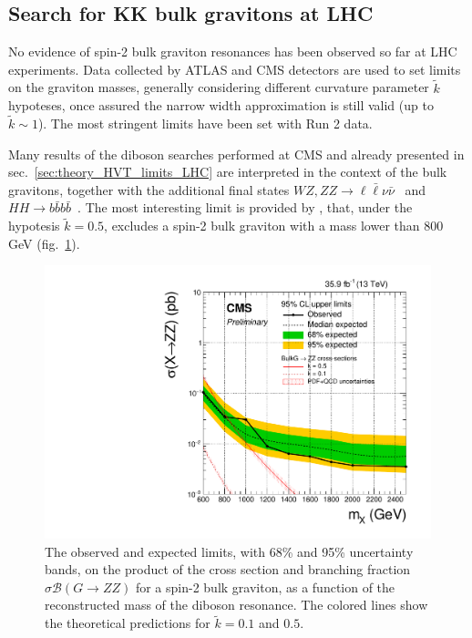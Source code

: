 \newpage
\subsection{Search for KK bulk gravitons at LHC}
\label{sec:theory_KK_limits_LHC}
No evidence of spin-2 bulk graviton resonances has been observed so far at LHC experiments. Data collected by ATLAS and CMS detectors are used to set limits on the graviton masses, generally considering different curvature parameter $\tilde{k}$ hypoteses, once assured the narrow width approximation is still valid (up to $\tilde{k} \sim 1$). The most stringent limits have been set with Run 2 data.

\vspace*{1\baselineskip}

Many results of the diboson searches performed at CMS and already presented in sec.~\ref{sec:theory_HVT_limits_LHC} are interpreted in the context of the bulk gravitons, together with the additional final states $WZ, ZZ \rightarrow \ell \bar{\ell} \nu \bar{\nu}$~\cite{CMS-PAS-B2G-16-023} and $HH \rightarrow b\bar{b} b \bar{b}$~\cite{CMS-PAS-B2G-16-026}. The most interesting limit is provided by \cite{CMS-PAS-B2G-16-023}, that, under the hypotesis $\tilde{k} = 0.5$, excludes a spin-2 bulk graviton with a mass lower than 800 GeV (fig.~\ref{fig:theory_B2G-16-023}).

\begin{figure}[!htb]
  \centering
    \includegraphics[width=.495\textwidth]{figures/B2G-16-023/Figure_005.pdf}
  \caption{The observed and expected limits, with 68\% and 95\% uncertainty bands, on the product of the cross section and branching fraction $\sigma \mathcal{B} (G \rightarrow ZZ)$ for a spin-2 bulk graviton, as a function of the reconstructed mass of the diboson resonance. The colored lines show the theoretical predictions for $\tilde{k}=0.1$ and $0.5$.}
  \label{fig:theory_B2G-16-023}
\end{figure}

\vspace*{1\baselineskip}


